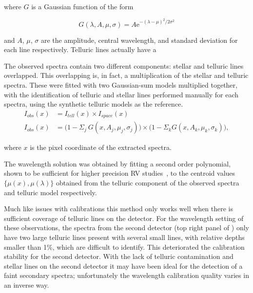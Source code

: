 where \(G \) is a Gaussian function of the form

\begin{equation}
G(\lambda, A, \mu, \sigma) = {A \textrm{e}}^{{-(\lambda-\mu)}^{2}/2\sigma^{2}}
\end{equation}

and \(A \), \(\mu \), \(\sigma \) are the amplitude, central wavelength, and standard deviation for each line respectively. Telluric lines actually have a %

The observed spectra contain two different components: stellar and telluric lines overlapped. This overlapping is, in fact, a multiplication of the stellar and telluric spectra. These were fitted with two Gaussian-sum models multiplied together, with the identification of telluric and stellar lines performed manually for each spectra, using the synthetic telluric models as the reference.
\begin{align}
I_{obs}(x) &= I_{tell}(x) \times I_{space}(x) \nonumber \\
I_{obs}(x) &= \Big(1 - {\Sigma}_{j}\ G(x, A_{j}, {\mu}_{j}, {\sigma}_{j})\Big) \times \Big(1 - {\Sigma}_{k} G(x, A_{k}, {\mu}_{k}, {\sigma}_{k})\Big), \label{eqn:obs}
\end{align}

where \(x \) is the pixel coordinate of the extracted spectra.

The wavelength solution was obtained by fitting a second order polynomial, shown to be sufficient for higher precision RV studies~\citep[e.g.][]{bean_groundbased_2010, figueira_radial_2010}, to the centroid values \(\{\mu(x), \mu(\lambda)\} \) obtained from the telluric component of the observed spectra and telluric model respectively. 

Much like issues with \thar calibrations this method only works well when there is sufficient coverage of telluric lines on the detector. For the wavelength setting of these observations, the spectra from the second detector (top right panel of ) only have two large telluric lines present with several small lines, with relative depths smaller than 1\%, which are difficult to identify. This deteriorated the calibration stability for the second detector. With the lack of telluric contamination and stellar lines on the second detector it may have been ideal for the detection of a faint secondary spectra; unfortunately the wavelength calibration quality varies in an inverse way.

